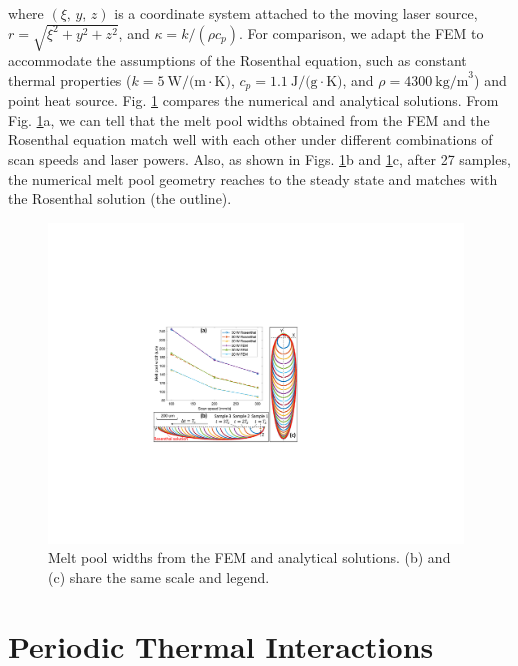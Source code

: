 \documentclass [11pt, proquest] {uwthesis}[2020/02/24]
\begin{document}
\noindent where $(\xi,\,y,\,z)$ is a coordinate system attached to
the moving laser source, $r=\sqrt{\xi^{2}+y^{2}+z^{2}}$, and $\kappa=k/(\rho c_{p})$.
For comparison, we adapt the FEM to accommodate the assumptions of
the Rosenthal equation, such as constant thermal properties ($k=5\:\text{W/(m}\cdotp\text{K)}$,
$c_{p}=1.1\:\text{J/(g}\cdotp\text{K)}$, and $\rho=4300\:\text{kg/m}^{3}$)
and point heat source. Fig. \ref{fig:Model-verification:-comparing}
compares the numerical and analytical solutions. From Fig. \ref{fig:Model-verification:-comparing}a,
we can tell that the melt pool widths obtained from the FEM and the
Rosenthal equation match well with each other under different combinations
of scan speeds and laser powers. Also, as shown in Figs. \ref{fig:Model-verification:-comparing}b
and \ref{fig:Model-verification:-comparing}c, after 27 samples, the
numerical melt pool geometry reaches to the steady state and matches
with the Rosenthal solution (the outline). 
\begin{figure}[!ht]
\begin{centering}
\includegraphics[clip,width=11cm]{Closed-loop-simulation/model_verification_rosenthal}
\par\end{centering}
\centering{}\caption{\label{fig:Model-verification:-comparing}Melt pool widths from the
FEM and analytical solutions. (b) and (c) share the same scale and
legend.}
\end{figure}

\section{Periodic Thermal Interactions} \label{sec:Periodic-Thermal-Interactions}
\end{document}
